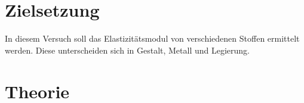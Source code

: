 \section{Zielsetzung}
\label{Zielsetzung}
In diesem Versuch soll das Elastizitätsmodul von verschiedenen Stoffen ermittelt werden.
Diese unterscheiden sich in Gestalt, Metall und Legierung.

\section{Theorie}
\label{Theorie}
